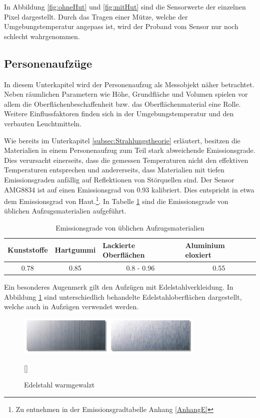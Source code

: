 In Abbildung \ref{fig:ohneHut} und \ref{fig:mitHut} sind die Sensorwerte der einzelnen Pixel dargestellt. Durch das Tragen einer Mütze, welche der Umgebungstemperatur angepass ist, wird der Proband vom Sensor nur noch schlecht wahrgenommen.

\subsection{Personenaufzüge}
\label{subsec:Personenaufzuege}
In diesem Unterkapitel wird der Personenaufzug als Messobjekt näher betrachtet. Neben räumlichen Parametern wie Höhe, Grundfläche und Volumen spielen vor allem die Oberflächenbeschaffenheit bzw. das Oberflächenmaterial eine Rolle. Weitere Einflussfaktoren finden sich in der Umgebungstemperatur und den verbauten Leuchtmitteln.

Wie bereits im Unterkapitel \ref{subsec:Strahlungstheorie} erläutert, besitzen die Materialien in einem Personenaufzug zum Teil stark abweichende Emissionsgrade. Dies verursacht einerseits, dass die gemessen Temperaturen nicht den effektiven Temperaturen entsprechen und andererseits, dass Materialien mit tiefen Emissionsgraden anfällig auf Reflektionen von Störquellen sind. Der Sensor AMG8834 ist auf einen Emissionsgrad von 0.93 kalibriert. Dies entspricht in etwa dem Emissionsgrad von Haut.\footnote[9]{Zu entnehmen in der Emissionsgradtabelle Anhang \ref{AnhangE}}. In Tabelle \ref{tab:Emission} sind die Emissionsgrade von üblichen Aufzugsmaterialien aufgeführt.
	
\begin{table}[H]
	\centering
	\caption{Emissionsgrade von üblichen Aufzugsmaterialien}
	\label{tab:Emission}
	\begin{tabular}{|l|l|l|l|}
		\hline
		\rowcolor[HTML]{C0C0C0} 
		Kunststoffe                & Hartgummi                 & Lackierte Oberflächen           & Aluminium eloxiert        \\ \hline
		\multicolumn{1}{|c|}{0.78} & \multicolumn{1}{c|}{0.85} & \multicolumn{1}{c|}{0.8 - 0.96} & \multicolumn{1}{c|}{0.55} \\ \hline
	\end{tabular}
\end{table}
	

Ein besonderes Augenmerk gilt den Aufzügen mit Edelstahlverkleidung. In Abbildung \ref{fig:Edelstahl} sind unterschiedlich behandelte Edelstahloberflächen dargestellt, welche auch in Aufzügen verwendet werden.  
\begin{figure}[H]
	\centering
	\includegraphics[width=0.8\textwidth]
	{fig/Edelstahl_matt.PNG}
	\caption[Edelstahl warmgewalzt]{Edelstahl warmgewalzt} [\protect\cite{Edelstahl}]
	\label{fig:Edelstahl}
\end{figure}

